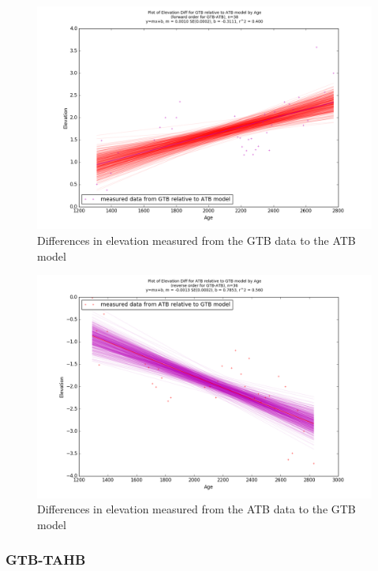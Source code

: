 \begin{figure}[h]
	\includegraphics[width=0.9\linewidth]{data/bothNonZero/withinSeventyFivePercent/gias/theGIA_GTB_relative_to_ATB.png}
	\caption{Differences in elevation measured from the GTB data to the ATB model}
	\label{fig:gias_GTBxATB}
\end{figure}
\newpage


\begin{figure}[h]
	\includegraphics[width=0.9\linewidth]{data/bothNonZero/withinSeventyFivePercent/gias/theGIA_ATB_relative_to_GTB.png}
	\caption{Differences in elevation measured from the ATB data to the GTB model}
	\label{fig:gias_ATBxGTB}
\end{figure}
\newpage








\subsubsection{GTB-TAHB}

